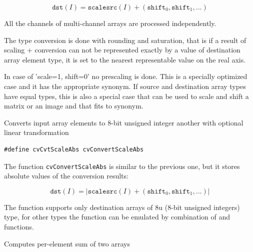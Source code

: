 \[
\texttt{dst}(I) = \texttt{scale} \texttt{src}(I) + (\texttt{shift}_0,\texttt{shift}_1,...)
\]

All the channels of multi-channel arrays are processed independently.

The type conversion is done with rounding and saturation, that is if a
result of scaling + conversion can not be represented exactly by a value
of destination array element type, it is set to the nearest representable
value on the real axis.

In case of 'scale=1, shift=0' no prescaling is done. This is a specially
optimized case and it has the appropriate  synonym. If
source and destination array types have equal types, this is also a
special case that can be used to scale and shift a matrix or an image
and that fits to  synonym.

\label{ConvertScaleAbs}

Converts input array elements to 8-bit unsigned integer another with optional linear transformation


\begin{lstlisting}
#define cvCvtScaleAbs cvConvertScaleAbs
\end{lstlisting}

\begin{description}
\end{description}


The function \texttt{cvConvertScaleAbs} is similar to the previous one, but it stores absolute values of the conversion results:

\[
\texttt{dst}(I) = |\texttt{scale} \texttt{src}(I) + (\texttt{shift}_0,\texttt{shift}_1,...)|
\]

The function supports only destination arrays of 8u (8-bit unsigned integers) type, for other types the function can be emulated by combination of  and  functions.

\label{Add}

Computes per-element sum of two arrays


